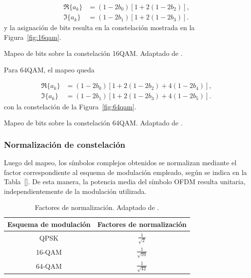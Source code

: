 \begin{align}
\Re\{a_k\} &= (1 - 2 b_0)\left[1 + 2(1 - 2 b_2)\right], \\
\Im\{a_k\} &= (1 - 2 b_1)\left[1 + 2(1 - 2 b_3)\right].
\end{align}
y la asignación de bits resulta en la constelación mostrada en la Figura~\ref{fig:16qam}.

{Mapeo de bits sobre la constelación 16QAM.}
{Adaptado de \cite{isdbt}.}
{\label{fig:16qam}}

Para 64QAM, el mapeo queda

\begin{align}
\Re\{a_k\} &= (1 - 2 b_0)\left[1 + 2(1 - 2 b_2) + 4(1 - 2 b_4)\right], \\
\Im\{a_k\} &= (1 - 2 b_1)\left[1 + 2(1 - 2 b_3) + 4(1 - 2 b_5)\right].
\end{align}
con la constelación de la Figura~\ref{fig:64qam}.

{Mapeo de bits sobre la constelación 64QAM.}
{Adaptado de \cite{isdbt}.}
{\label{fig:64qam}}

\subsubsection{Normalización de constelación}
Luego del mapeo, los símbolos complejos obtenidos se normalizan mediante el factor correspondiente al esquema de modulación empleado, según se indica en la Tabla~[]. De esta manera, la potencia media del símbolo OFDM resulta unitaria, independientemente de la modulación utilizada.
{
\renewcommand{\arraystretch}{1.3}
\begin{table}[H]
    \centering
    \caption[{Factores de normalización.}]{Factores de normalización. Adaptado de \cite{abnt}.}
    \label{tab:normalizacion}

    \begin{tabular}{|c | c|}
        \hline
        \textbf{Esquema de modulación} & \textbf{Factores de normalización} \\
        \hline
        QPSK & $\frac{1}{\sqrt{2}}$ \rule[-2.2ex]{0pt}{3.2ex}\\
        \hline
        16-QAM & $\frac{1}{\sqrt{10}}$ \rule[-2.2ex]{0pt}{3.2ex}\\
        \hline
        64-QAM & $\frac{1}{\sqrt{42}}$ \rule[-2.2ex]{0pt}{3.2ex}\\
        \hline
    \end{tabular}
\end{table}
}

